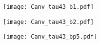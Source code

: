 \begin{figure}[H]
    \begin{center}
        \texttt{[image: Canv\_tau43\_b1.pdf]}
        \caption{}
    \end{center}
\end{figure}
\begin{figure}[H]
    \begin{center}
        \texttt{[image: Canv\_tau43\_b2.pdf]}
        \caption{}
    \end{center}
\end{figure}
\begin{figure}[H]
    \begin{center}
        \texttt{[image: Canv\_tau43\_bp5.pdf]}
        \caption{}
    \end{center}
\end{figure}
